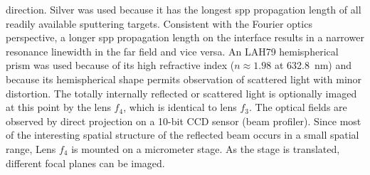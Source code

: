 direction.  Silver was used because it has the longest \gls{spp} propagation
length of all readily available sputtering targets.
Consistent with the Fourier optics perspective, a longer \gls{spp} propagation
length on the interface results in a narrower resonance linewidth in the
far field and vice versa.  An LAH79 hemispherical prism was used because of
its high refractive index ($n\approx 1.98$ at \SI{632.8}{\nano\meter}) and
because its hemispherical shape permits observation of scattered light with
minor distortion.  The totally internally reflected or scattered light is
optionally imaged at this point by the lens $f_4$, which is identical to
lens $f_3$.  The optical fields are observed by direct projection on a 10-bit
CCD sensor (beam profiler).  Since most of the interesting spatial structure of the
reflected beam occurs in a small spatial range, Lens $f_4$
is mounted on a micrometer stage.  As the stage is translated, different focal
planes can be imaged.

